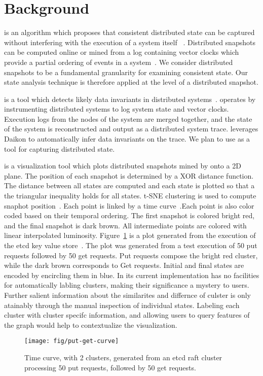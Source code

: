 \section{Background}
\label{sec:background}


 is an algorithm which
proposes that consistent distributed state can be captured without
interfering with the execution of a system itself
~\cite{dist_snapshots_Chandy1985}.  Distributed snapshots can be
computed online or mined from a log containing vector clocks which
provide a partial ordering of events in a
system~\cite{mattern_vector_clocks_1989}. We consider distributed
snapshots to be a fundamental granularity for examining consistent
state. Our state analysis technique is therefore applied at the level
of a distributed snapshot.

\noindent{\textbf{\dinv}} is a tool which detects likely data
invariants in distributed systems~\cite{dinv}. \dinv operates by
instrumenting distributed systems to log system state and vector
clocks.  Execution logs from the nodes of the system are merged
together, and the state of the system is reconstructed and output as a
distributed system trace. \dinv leverages Daikon to automatically
infer data invariants on the trace.  We plan to use \dinv as a tool
for capturing distributed state.

\noindent{\textbf{\dviz}} is a visualization tool which plots
distributed snapshots mined by \dinv onto a 2D plane. The position of
each snapshot is determined by a XOR distance function. The distance
between all states are computed and each state is plotted so that a
the triangular inequality holds for all states. t-SNE clustering is
used to compute snaphot position~\cite{maaten2008visualizing}. Each
point is linked by a time curve~\cite{Bach2015timecurves}.Each point
is also color coded based on their temporal ordering. The first
snapshot is colored bright red, and the final snapshot is dark brown.
All intermediate points are colored with linear interpolated
luminosity. Figure~\ref{fig:put-get-curve} is a \dviz plot generated
from the execution of the etcd key value store~\cite{etcdraft}. The
plot was generated from a test execution of 50 put requests followed
by 50 get requests. Put requests compose the bright red cluster, while
the dark brown corresponds to Get requests. Initial and final states
are encoded by encircling them in blue. In its current implementation
\dviz has no facilities for automatically labling clusters, making
their significance a mystery to users. Further salient information
about the similarites and differnce of culster is only atainably
through the manual inspection of individual states. Labeling each
cluster with cluster specifc information, and allowing users to query
features of the graph would help to contextualize the visualization.

\begin{figure}[h]
    \texttt{[image: fig/put-get-curve]}%
    \caption{Time curve, with 2 clusters, generated from an etcd raft cluster processing 50 put requests, followed by 50 get requests.\label{fig:put-get-curve}}%
\end{figure}
